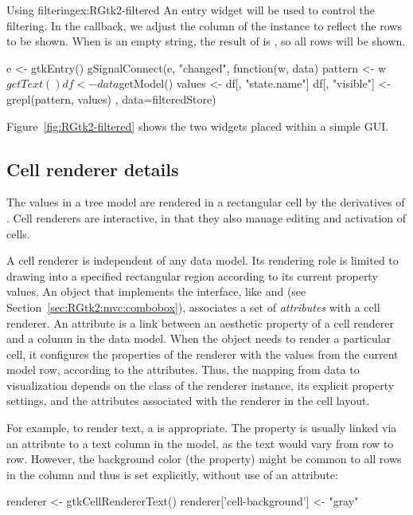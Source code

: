 \begin{example}{Using filtering}{ex:RGtk2-filtered}
An entry widget will be used to control the filtering. In the
callback, we adjust the  column of the
 instance to reflect the rows to be shown. When
 is an empty string, the result of  is 
, so all rows will be shown.
\begin{Schunk}
\begin{Sinput}
 e <- gtkEntry()
 gSignalConnect(e, "changed", function(w, data) {
   pattern <- w$getText()
   df <- data$getModel()
   values <- df[, "state.name"]
   df[, "visible"] <- grepl(pattern, values)
 }, data=filteredStore)
\end{Sinput}
\end{Schunk}


Figure~\ref{fig:RGtk2-filtered} shows the two widgets placed within a
simple GUI.
\end{example}

\subsection{Cell renderer details}
\label{sec:RGtk2:cellrenderers}

The values in a tree model are rendered in a rectangular cell by the
derivatives of . Cell renderers are
interactive, in that they also manage editing and activation of cells.

A cell renderer is independent of any data model. Its rendering role
is limited to drawing into a specified rectangular region according to
its current property values. An object that implements the
 interface, like  and
 (see Section~\ref{sec:RGtk2:mvc:combobox}),
associates a set of \emph{attributes} with a cell renderer. An
attribute is a link between an aesthetic property of a cell renderer
and a column in the data model. When the  object
needs to render a particular cell, it configures the properties of the
renderer with the values from the current model row, according to the
attributes. Thus, the mapping from data to visualization depends on
the class of the renderer instance, its explicit property settings,
and the attributes associated with the renderer in the cell layout.

For example, to render text, a  is
appropriate. The  property is usually linked via an
attribute to a text column in the model, as the text would vary from
row to row. However, the background color (the 
property) might be common to all rows in the column and thus is set
explicitly, without use of an attribute:
\begin{Schunk}
\begin{Sinput}
 renderer <- gtkCellRendererText()
 renderer['cell-background'] <- "gray"
\end{Sinput}
\end{Schunk}

